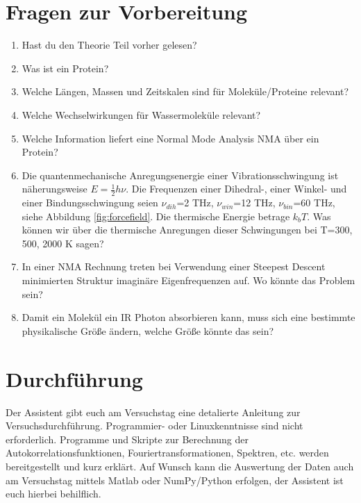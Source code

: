 \documentclass[a4paper,12pt]{article}
\begin{document}
\section*{Fragen zur Vorbereitung}
\begin{enumerate}
 \item Hast du den Theorie Teil vorher gelesen?
 \item Was ist ein Protein?
 \item Welche Längen, Massen und Zeitskalen sind für Moleküle/Proteine relevant?
 \item Welche Wechselwirkungen für Wassermoleküle relevant?
 \item Welche Information liefert eine Normal Mode Analysis NMA über ein Protein?
 \item Die quantenmechanische Anregungsenergie einer Vibrationsschwingung ist näherungsweise $E=\frac{1}{2}h \nu$. Die Frequenzen einer Dihedral-, 
 einer Winkel- und einer Bindungsschwingung seien $\nu_{dih}$=2 THz, $\nu_{win}$=12 THz, $\nu_{bin}$=60 THz, siehe Abbildung \ref{fig:forcefield}. 
 Die thermische Energie betrage $k_bT$.
 Was können wir über die thermische Anregungen dieser Schwingungen bei T=300, 500, 2000 K sagen?
 \item In einer NMA Rechnung treten bei Verwendung einer Steepest Descent minimierten Struktur imaginäre Eigenfrequenzen auf. Wo könnte das Problem sein?
 \item Damit ein Molekül ein IR Photon absorbieren kann, muss sich eine bestimmte physikalische Größe ändern, welche Größe könnte das sein?
\end{enumerate}

\pagebreak
\section*{Durchführung}
Der Assistent gibt euch am Versuchstag eine detalierte Anleitung zur Versuchsdurchführung. Programmier- oder Linuxkenntnisse sind nicht erforderlich.
Programme und Skripte zur Berechnung der Autokorrelationsfunktionen, Fouriertransformationen, Spektren, etc. werden bereitgestellt und kurz erklärt. 
Auf Wunsch kann die Auswertung der Daten auch am Versuchstag mittels Matlab oder NumPy/Python erfolgen, der Assistent ist euch hierbei behilflich.
\end{document}
